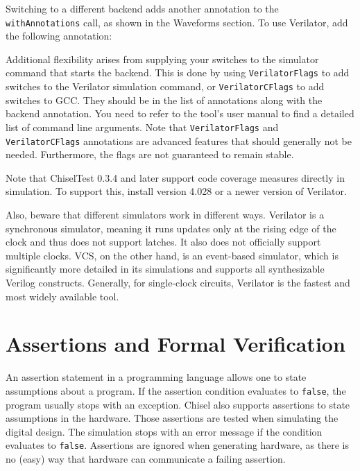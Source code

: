 \documentclass[%
    10pt,
    headinclude, footexclude,
    openright, %
    notitlepage,
    cleardoubleempty,
    headsepline,
    pointlessnumbers,
    bibtotoc, idxtotoc,
    ]{scrbook}
\newcommand{\code}[1]{{\lstinline[basicstyle=\small\ttfamily]{#1}}}
\begin{document}
Switching to a different backend adds another annotation to the
\code{withAnnotations} call, as shown in the Waveforms section.
To use Verilator, add the following annotation:


Additional flexibility arises from supplying your switches to the
simulator command that starts the backend. This is done by using \code{VerilatorFlags}
to add switches to the Verilator simulation command, or \code{VerilatorCFlags} to add
switches to GCC. They should be in the list of annotations along with the backend
annotation. You need to refer to the tool's user manual to find a detailed list of command line arguments.
Note that \code{VerilatorFlags} and \code{VerilatorCFlags} annotations are advanced features
that should generally not be needed. Furthermore, the flags are not guaranteed to remain stable.

Note that ChiselTest 0.3.4 and later support code coverage measures directly in simulation.
To support this, install version 4.028 or a newer version of Verilator.

Also, beware that different simulators work in different ways. Verilator is a
synchronous simulator, meaning it runs updates only at the rising edge of the
clock and thus does not support latches. It also does not officially support multiple
clocks. VCS, on the other hand, is an event-based simulator, which is significantly more
detailed in its simulations and supports all synthesizable Verilog constructs.
Generally, for single-clock circuits, Verilator is the fastest and
most widely available tool.

\section{Assertions and Formal Verification}

An assertion statement in a programming language allows one to state assumptions about a program.
If the assertion condition evaluates to \code{false}, the program usually stops with an exception.
Chisel also supports assertions to state assumptions in the hardware. Those assertions are tested
when simulating the digital design. The simulation stops with an error message if the condition evaluates to \code{false}. Assertions are ignored when generating hardware, as there is no (easy) way that
hardware can communicate a failing assertion.

\end{document}
